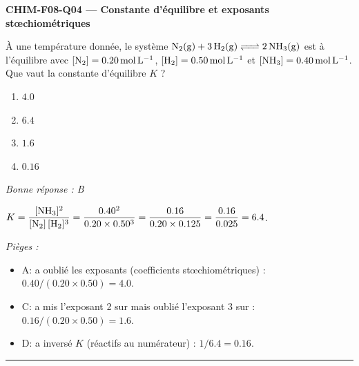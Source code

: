 \documentclass[11pt,a4paper]{article}
\begin{document}
\noindent\textbf{CHIM-F08-Q04 --- Constante d'équilibre et exposants stœchiométriques}\par
À une température donnée, le système $\ce{N2(g) + 3 H2(g) <=> 2 NH3(g)}$ est à l'équilibre avec $[\ce{N2}]=\qty{0.20}{\mol\per\litre}$, $[\ce{H2}]=\qty{0.50}{\mol\per\litre}$ et $[\ce{NH3}]=\qty{0.40}{\mol\per\litre}$. Que vaut la constante d'équilibre $K$ ?
\begin{enumerate}[label=\Alph*)]
\item $\num{4.0}$
\item $\num{6.4}$
\item $\num{1.6}$
\item $\num{0.16}$
\end{enumerate}
\textit{Bonne réponse : B}\par
$K=\dfrac{[\ce{NH3}]^2}{[\ce{N2}]\,[\ce{H2}]^3}=\dfrac{\num{0.40}^2}{\num{0.20}\times\num{0.50}^3}=\dfrac{\num{0.16}}{\num{0.20}\times\num{0.125}}=\dfrac{\num{0.16}}{\num{0.025}}=\num{6.4}$.\par
\textit{Pièges :}
\begin{itemize}
\item A: a oublié les exposants (coefficients stœchiométriques) : $\num{0.40}/(\num{0.20}\times\num{0.50})=\num{4.0}$.
\item C: a mis l'exposant 2 sur  mais oublié l'exposant 3 sur  : $\num{0.16}/(\num{0.20}\times\num{0.50})=\num{1.6}$.
\item D: a inversé $K$ (réactifs au numérateur) : $1/\num{6.4}=\num{0.16}$.
\end{itemize}
\vspace{8pt}\hrule\vspace{8pt}
\end{document}
